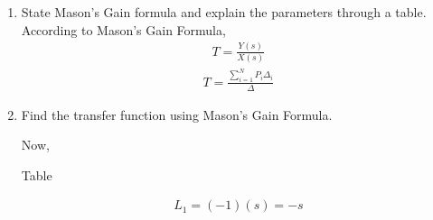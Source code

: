 \begin{enumerate}[label=\thesection.\arabic*.,ref=\thesection.\theenumi]
\item State Mason's Gain formula and explain the parameters through a table.
\\
\solution 
According to Mason's Gain Formula,
\begin{align}
T = \frac{Y(s)}{X(s)} 
\end{align}
\begin{align}
T = \frac{\sum_{i=1}^{N} P_i\Delta_i}{\Delta}
\end{align}
\item  Find the transfer function using Mason's Gain Formula.
\renewcommand{\thefigure}{\theenumi.\arabic{figure}}
%
\\
\solution 




Now, 

\begin{table}[!ht]
\begin{center}
		
		\resizebox{\columnwidth}{!}{}
	\end{center}
\caption{Table}
\label{fig:sec_order}
\end{table}






\begin{align}
L_1=(-1)(s)=-s
\end{align}


\end{enumerate}

